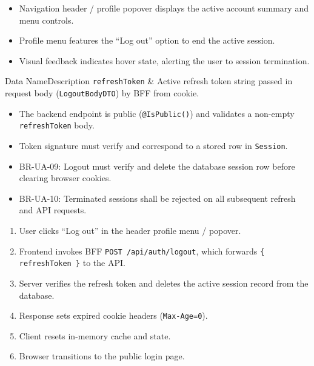 \begin{itemize}[leftmargin=1.6em,topsep=3pt,itemsep=2pt,parsep=0pt,label=$\bullet$]
    \item Navigation header / profile popover displays the active account summary and menu controls.
    \item Profile menu features the ``Log out'' option to end the active session.
    \item Visual feedback indicates hover state, alerting the user to session termination.
\end{itemize}


\begin{specdatatable}{Data Name}{Description}
\texttt{refreshToken} & Active refresh token string passed in request body (\texttt{LogoutBodyDTO}) by BFF from cookie.\\ \hline
\end{specdatatable}

\begin{itemize}[leftmargin=1.6em,topsep=3pt,itemsep=2pt,parsep=0pt,label=$\bullet$]
    \item The backend endpoint is public (\texttt{@IsPublic()}) and validates a non-empty \texttt{refreshToken} body.
    \item Token signature must verify and correspond to a stored row in \texttt{Session}.
\end{itemize}

\begin{itemize}[leftmargin=1.6em,topsep=3pt,itemsep=2pt,parsep=0pt,label=$\bullet$]\brrulelist
    \item BR-UA-09: Logout must verify and delete the database session row before clearing browser cookies.
    \item BR-UA-10: Terminated sessions shall be rejected on all subsequent refresh and API requests.
\end{itemize}

\begin{enumerate}[leftmargin=1.8em,topsep=3pt,itemsep=2pt,parsep=0pt]
    \item User clicks ``Log out'' in the header profile menu / popover.
    \item Frontend invokes BFF \texttt{POST /api/auth/logout}, which forwards \texttt{\{ refreshToken \}} to the API.
    \item Server verifies the refresh token and deletes the active session record from the database.
    \item Response sets expired cookie headers (\texttt{Max-Age=0}).
    \item Client resets in-memory cache and state.
    \item Browser transitions to the public login page.
\end{enumerate}

